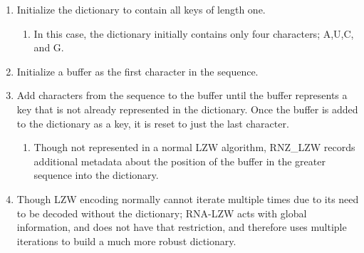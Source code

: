 \documentclass[sigconf]{acmart}
\begin{document}
\begin{enumerate}
\item Initialize the dictionary to contain all keys of length one. 
	\begin{enumerate}
		\item In this case, the dictionary initially contains only four characters; A,U,C, and G. 
	\end{enumerate}
\item Initialize a buffer as the first character in the sequence.
\item Add characters from the sequence to the buffer until the buffer represents a key that is not already represented in the dictionary. Once the buffer is added to the dictionary as a key, it is reset to just the last character.
	\begin{enumerate}
		\item Though not represented in a normal LZW algorithm, RNZ\_LZW records additional metadata about the position of the buffer in the greater sequence into the dictionary.
	\end{enumerate}
\item Though LZW encoding normally cannot iterate multiple times due to its need to be decoded without the dictionary; RNA-LZW acts with global information, and does not have that restriction, and therefore uses multiple iterations to build a much more robust dictionary.
\end{enumerate}
\end{document}
